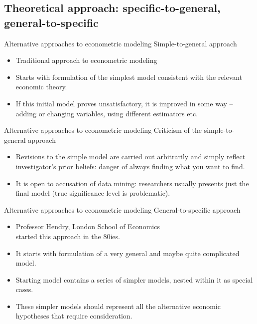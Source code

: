 \documentclass{beamer}
\begin{document}
\subsection{Theoretical approach: specific-to-general, general-to-specific}
\begin{frame}{Alternative approaches to econometric modeling}
Simple-to-general approach\\
\vspace{0.3cm}
\begin{itemize}
\item Traditional approach to econometric modeling
\vspace{0.3cm}
\item Starts with formulation of the simplest model consistent with the relevant economic theory.
\vspace{0.3cm}
\item If this initial model proves unsatisfactory, it is improved in some way – adding or changing variables, using different estimators etc.
\end{itemize}
\end{frame}
\begin{frame}{Alternative approaches to econometric modeling}
 Criticism  of the simple-to-general approach\\
\begin{itemize}
\vspace{0.3cm}
\item Revisions to the simple model are carried out arbitrarily and simply reflect investigator's prior beliefs: danger of always finding what you want to find.
\vspace{0.3cm}
\item It is open to accusation of data mining: researchers usually presents just the final model (true significance level is problematic).
\end{itemize}
\end{frame}
\begin{frame}{Alternative approaches to econometric modeling}
General-to-specific approach\\
\medskip
\begin{itemize}
\item Professor Hendry, London School of Economics \\started this approach in the 80ies.
\medskip
\item It starts with formulation of a very general and maybe quite complicated model.
\medskip
\item Starting model contains a series of simpler models, nested within it as special cases. 
\medskip
\item These simpler models should represent all the alternative economic hypotheses that require consideration.
\end{itemize}
\end{frame}
\end{document}
